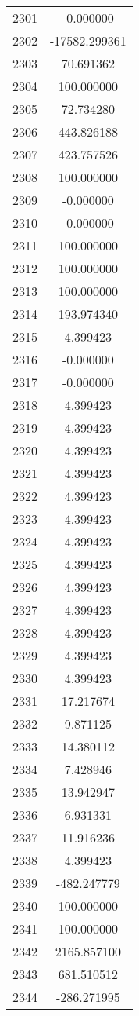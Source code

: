 \documentclass[12pt]{article}
\begin{document}
\begin{longtable}{@{}cc@{}}
2301 & -0.000000 \\
2302 & -17582.299361 \\
2303 & 70.691362 \\
2304 & 100.000000 \\
2305 & 72.734280 \\
2306 & 443.826188 \\
2307 & 423.757526 \\
2308 & 100.000000 \\
2309 & -0.000000 \\
2310 & -0.000000 \\
2311 & 100.000000 \\
2312 & 100.000000 \\
2313 & 100.000000 \\
2314 & 193.974340 \\
2315 & 4.399423 \\
2316 & -0.000000 \\
2317 & -0.000000 \\
2318 & 4.399423 \\
2319 & 4.399423 \\
2320 & 4.399423 \\
2321 & 4.399423 \\
2322 & 4.399423 \\
2323 & 4.399423 \\
2324 & 4.399423 \\
2325 & 4.399423 \\
2326 & 4.399423 \\
2327 & 4.399423 \\
2328 & 4.399423 \\
2329 & 4.399423 \\
2330 & 4.399423 \\
2331 & 17.217674 \\
2332 & 9.871125 \\
2333 & 14.380112 \\
2334 & 7.428946 \\
2335 & 13.942947 \\
2336 & 6.931331 \\
2337 & 11.916236 \\
2338 & 4.399423 \\
2339 & -482.247779 \\
2340 & 100.000000 \\
2341 & 100.000000 \\
2342 & 2165.857100 \\
2343 & 681.510512 \\
2344 & -286.271995 \\

\end{longtable}
\end{document}

